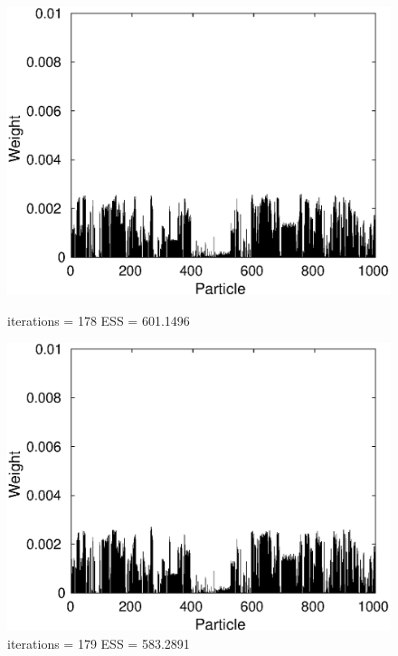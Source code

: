 \documentclass[12pt]{article}
\begin{document}
\begin{figure}[h!]
\begin{minipage}{0.5\textwidth}
		\includegraphics[scale = 0.5]{./Figures/178.eps}
		\caption*{iterations = 178 ESS = 601.1496}
	\end{minipage}%
	\begin{minipage}{0.5\textwidth}
		\centering
		\includegraphics[scale = 0.5]{./Figures/179.eps}
		\caption*{iterations = 179 ESS = 583.2891}
	\end{minipage}
	\begin{minipage}{0.5\textwidth}
		\centering

\end{minipage}
\end{figure}
\end{document}
